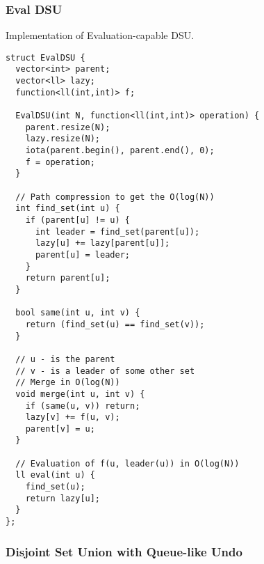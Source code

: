 \begin{center}
\begin{minipage}[t]{0.45\linewidth}
\subsubsection{Eval DSU}

Implementation of Evaluation-capable DSU.
\begin{lstlisting}
struct EvalDSU {
  vector<int> parent;
  vector<ll> lazy;
  function<ll(int,int)> f;

  EvalDSU(int N, function<ll(int,int)> operation) {
    parent.resize(N);
    lazy.resize(N);
    iota(parent.begin(), parent.end(), 0);
    f = operation;
  }

  // Path compression to get the O(log(N))
  int find_set(int u) {
    if (parent[u] != u) {
      int leader = find_set(parent[u]);
      lazy[u] += lazy[parent[u]];
      parent[u] = leader;
    }
    return parent[u];
  }

  bool same(int u, int v) {
    return (find_set(u) == find_set(v));
  }

  // u - is the parent
  // v - is a leader of some other set
  // Merge in O(log(N))
  void merge(int u, int v) {
    if (same(u, v)) return;
    lazy[v] += f(u, v);
    parent[v] = u;
  }
  
  // Evaluation of f(u, leader(u)) in O(log(N))
  ll eval(int u) {
    find_set(u);
    return lazy[u];
  }
};
\end{lstlisting}
\end{minipage}
\end{center}

\newpage

\subsubsection{Disjoint Set Union with Queue-like Undo}

